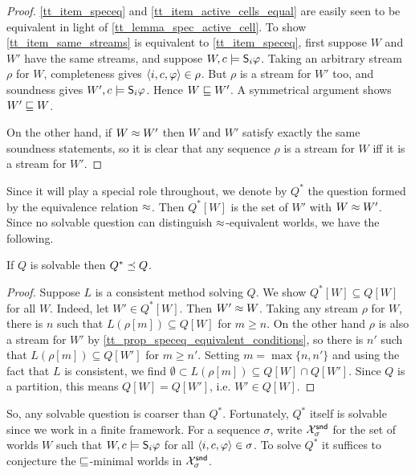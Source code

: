 \begin{proof}
    \cref{tt_item_speceq} and \cref{tt_item_active_cells_equal} are easily seen to be
    equivalent in light of \cref{tt_lemma_spec_active_cell}. To show
    \cref{tt_item_same_streams} is equivalent to \cref{tt_item_speceq}, first suppose
    $W$ and $W'$ have the same streams, and suppose $W, c \models \S_i\phi$.
    Taking an arbitrary stream $\rho$ for $W$, completeness gives $\tuple{i, c,
    \phi} \in \rho$. But $\rho$ is a stream for $W'$ too, and soundness gives
    $W', c \models \S_i\phi$. Hence $W \specleq W'$. A symmetrical argument
    shows $W' \specleq W$.

    On the other hand, if $W \speceq W'$ then $W$ and $W'$ satisfy exactly the
    same soundness statements, so it is clear that any sequence $\rho$ is a
    stream for $W$ iff it is a stream for $W'$.
\end{proof}

Since it will play a special role throughout, we denote by $Q^*$ the question
formed by the equivalence relation $\speceq$. Then $Q^*[W]$ is the set of $W'$
with $W \speceq W'$. Since no solvable question can distinguish
$\speceq$-equivalent worlds, we have the following.

\begin{lemma}
    \label{tt_lemma_solvable_implies_coarser_than_qstar}
    If $Q$ is solvable then $Q^* \refines Q$.
\end{lemma}

\begin{proof}
    Suppose $L$ is a consistent method solving $Q$. We show $Q^*[W] \subseteq
    Q[W]$ for all $W$.  Indeed, let $W' \in Q^*[W]$. Then $W' \speceq W$.
    Taking any stream $\rho$ for $W$, there is $n$ such that $L(\rho[m])
    \subseteq Q[W]$ for $m \ge n$. On the other hand $\rho$ is also a stream
    for $W'$ by \cref{tt_prop_speceq_equivalent_conditions}, so there is $n'$ such
    that $L(\rho[m]) \subseteq Q[W']$ for $m \ge n'$. Setting $m = \max\{n,
    n'\}$ and using the fact that $L$ is consistent, we find $\emptyset \subset
    L(\rho[m]) \subseteq Q[W] \cap Q[W']$. Since $Q$ is a partition, this means
    $Q[W] = Q[W']$, i.e. $W' \in Q[W]$.
\end{proof}

So, any solvable question is coarser than $Q^*$. Fortunately, $Q^*$ itself is
solvable since we work in a finite framework. For a sequence $\sigma$, write
$\Xsnd_\sigma$ for the set of worlds $W$ such that $W, c \models \S_i\phi$ for
all $\tuple{i, c, \phi} \in \sigma$. To solve $Q^*$ it suffices to conjecture
the $\specleq$-minimal worlds in $\Xsnd_\sigma$.

